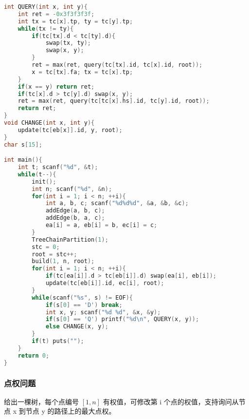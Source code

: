 \begin{lstlisting}[language=C++]
int QUERY(int x, int y){
    int ret = -0x3f3f3f3f;
    int tx = tc[x].tp, ty = tc[y].tp;
    while(tx != ty){
        if(tc[tx].d < tc[ty].d){
            swap(tx, ty);
            swap(x, y);
        }
        ret = max(ret, query(tc[tx].id, tc[x].id, root));
        x = tc[tx].fa; tx = tc[x].tp;
    }
    if(x == y) return ret;
    if(tc[x].d > tc[y].d) swap(x, y);
    ret = max(ret, query(tc[tc[x].hs].id, tc[y].id, root));
    return ret;
}
void CHANGE(int x, int y){
    update(tc[eb[x]].id, y, root);
}
char s[15];

int main(){
    int t; scanf("%d", &t);
    while(t--){
        init();
        int n; scanf("%d", &n);
        for(int i = 1; i < n; ++i){
            int a, b, c; scanf("%d%d%d", &a, &b, &c);
            addEdge(a, b, c);
            addEdge(b, a, c);
            ea[i] = a, eb[i] = b, ec[i] = c;
        }
        TreeChainPartition(1);
        stc = 0;
        root = stc++;
        build(1, n, root);
        for(int i = 1; i < n; ++i){
            if(tc[ea[i]].d > tc[eb[i]].d) swap(ea[i], eb[i]);
            update(tc[eb[i]].id, ec[i], root);
        }
        while(scanf("%s", s) != EOF){
            if(s[0] == 'D') break;
            int x, y; scanf("%d %d", &x, &y);
            if(s[0] == 'Q') printf("%d\n", QUERY(x, y));
            else CHANGE(x, y);
        }
        if(t) puts("");
    }
    return 0;
}
\end{lstlisting}

\subsubsection{点权问题}

给出一棵树，每个点编号 $[1, n]$ 有权值，可修改第 i 个点的权值，支持询问从节点 x 到节点 y 的路径上的最大点权。

